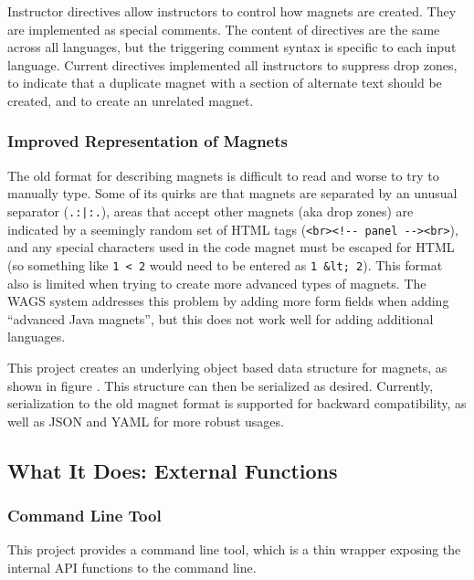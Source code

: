 \documentclass[letter,10pt]{article}
\begin{document}
Instructor directives allow instructors to control how magnets are 
created. They are implemented as special comments. The 
content of directives are the same across all languages, but the 
triggering comment syntax is specific to each input language. Current 
directives implemented all instructors to suppress drop zones, to 
indicate that a duplicate magnet with a section of alternate text 
should be created, and to create an unrelated magnet.

\subsubsection{Improved Representation of Magnets}

The old format for describing magnets is difficult to read and worse to 
try to manually type. Some of its quirks are that magnets are separated 
by an unusual separator (\verb~.:|:.~), areas that accept other magnets 
(aka drop zones) are indicated by a seemingly random set of HTML tags 
(\verb~<br><!-- panel --><br>~), and any special characters used in the 
code magnet must be escaped for HTML (so something like \verb~1 < 2~ 
would need to be entered as \verb~1 &lt; 2~). This format also is 
limited when trying to create more advanced types of magnets. The WAGS 
system addresses this problem by adding more form fields when adding 
``advanced Java magnets'', but this does not work well for adding 
additional languages.


This project creates an underlying object based data structure for 
magnets, as shown in figure . This 
structure can then be serialized as desired. Currently, serialization to 
the old magnet format is supported for backward compatibility, as well 
as JSON and YAML for more robust usages.



\subsection{What It Does: External Functions}

\subsubsection{Command Line Tool}

This project provides a command line tool, which is a thin wrapper 
exposing the internal API functions to the command line.
\end{document}
